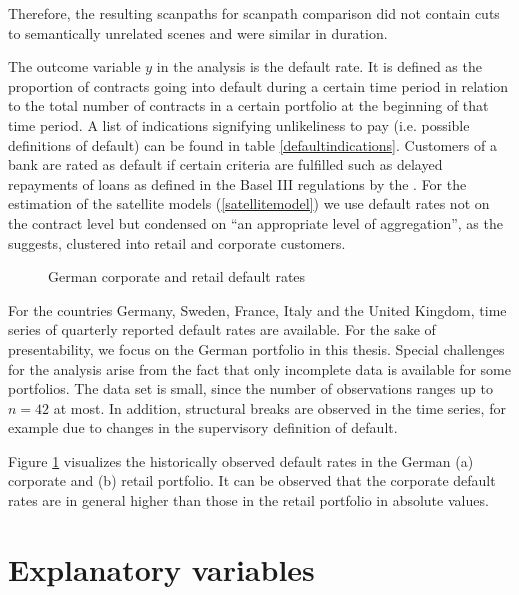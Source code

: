 \documentclass[a4paper, 11pt]{scrreprt}
\begin{document}
Therefore, the resulting scanpaths for scanpath comparison did not contain cuts to semantically unrelated scenes and were similar in duration.

\bigskip

The outcome variable $y$ in the analysis is the default rate. It is defined as the proportion of contracts going into default during a certain time period in relation to the total number of contracts in a certain portfolio at the beginning of that time period.
A list of indications signifying unlikeliness to pay (i.e. possible definitions of default) can be found in table \ref{defaultindications}. Customers of a bank are rated as default if certain criteria are fulfilled such as delayed repayments of loans as defined in the Basel III regulations by the \textcite{bcbs2010baselIII}. 
For the estimation of the satellite models (\ref{satellitemodel}) we use default rates not on the contract level but condensed on ``an appropriate level of aggregation'', as the \textcite[chapter 5.5]{ecb2018srep} suggests, clustered into retail and corporate customers.

\begin{figure}[H]
	\caption{German corporate and retail default rates}
	\label{plot:germandefaultrates}
\end{figure}


For the countries Germany, Sweden, France, Italy and the United Kingdom, time series of quarterly reported default rates are available. For the sake of presentability, we focus on the German portfolio in this thesis.
Special challenges for the analysis arise from the fact that only incomplete data is available for some portfolios. The data set is small, since the number of observations ranges up to $n=42$ at most. In addition, structural breaks are observed in the time series, for example due to changes in the supervisory definition of default. 

Figure \ref{plot:germandefaultrates} visualizes the historically observed default rates in the German (a) corporate and (b) retail portfolio.
It can be observed that the corporate default rates are in general higher than those in the retail portfolio in absolute values. 

\section{Explanatory variables}
\end{document}
